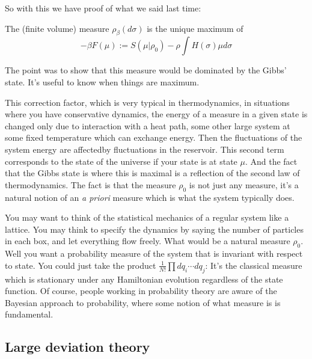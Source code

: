 So with this we have proof of what we said last time: 

\begin{thm}
The (finite volume)  measure $\rho_{\beta}(d\sigma)$ is the unique maximum of 
\[
-\beta F(\mu) := S(\mu|\rho_0) - \rho \int H(\sigma) \mu d\sigma
\]
\end{thm}
The point was to show that this measure would be dominated by the Gibbs' state. It's useful to know when things are maximum. 

This correction factor, which is very typical in thermodynamics, in situations where you have conservative dynamics, the energy of a measure in a given state is changed only due to interaction with a heat path, some other large system at some fixed temperature which can exchange energy. Then the fluctuations of the system energy are affectedby fluctuations in the reservoir. This second term corresponds to the state of the universe if your state is at state $\mu$. And the fact that the Gibbs state is where this is maximal is a reflection of the second law of thermodynamics. The fact is that the measure $\rho_0$ is not just any measure, it's a natural notion of an \textit{a priori} measure which is what the system typically does. 

You may want to think of the statistical mechanics of a regular system like a lattice. You may think to specify the dynamics by saying the number of particles in each box, and let everything flow freely. What would be a natural measure $\rho_0$. Well you want a probability measure of the system that is invariant with respect to state. You could just take the product $\frac{1}{N!}\prod dq_i \cdots dq_j$: It's the classical measure which is stationary under any Hamiltonian evolution regardless of the state function. Of course, people working in probability theory are aware of the Bayesian approach to probability, where some notion of what  measure is is fundamental. 


\subsection{Large deviation theory}

